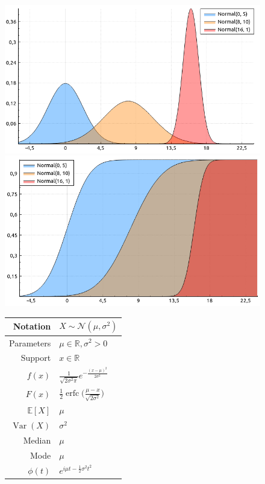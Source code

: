 \documentclass[a4paper,11pt]{article}
\theoremstyle{plain}
\theoremstyle{definition}
\newcommand{\ME}{\mathbb{E}}
\newcommand{\MR}{\mathbb{R}}
\newcommand{\Var}{\operatorname{Var}}
\begin{document}
	\begin{figure}[!htb]\centering
		\begin{minipage}{0.55\textwidth}
			\includegraphics[width=\linewidth, right]{normal_pdf}
			\captionsetup{labelformat=empty}
			\includegraphics[width=\linewidth, right]{normal_cdf}
			\captionsetup{labelformat=empty}
		\end{minipage}
		\begin{minipage}{0.4\textwidth}
		\begin{tabular}{| r | l |}
			\hline
			Notation & $X \sim \mathcal{N}(\mu, \sigma^2)$ \\
			\hline
			Parameters & $\mu \in \MR, \sigma^2 > 0 $ \\
			\hline
			Support & $x \in \MR$  \\
			\hline
			$f(x)$ & $ \frac{1}{\sqrt{2\sigma^2\pi}}e^{-\frac{(x-\mu)^2}{2\sigma^2}}  $ \\
			\hline
			$F(x)$ & $ \frac{1}{2} \operatorname{erfc}\Big( \frac{\mu-x}{\sqrt{2\sigma^2}} \Big) $ \\
			\hline
			$\ME[X]$ & $ \mu$ \\
			\hline
			$\Var(X)$ & $\sigma^2$\\
			\hline
			Median & $\mu$ \\
			\hline
			Mode & $\mu$ \\
			\hline
			$\phi(t)$ & $ e^{i\mu t - \frac{1}{2}\sigma^2t^2}  $ \\
			\hline
		\end{tabular}
    	\end{minipage}
	\end{figure}
\end{document}
